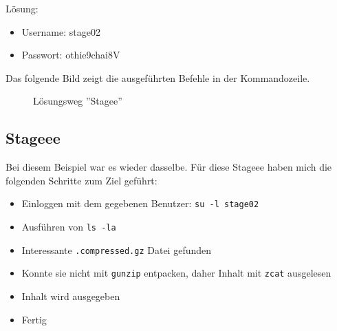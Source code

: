 \documentclass[12pt, a4paper, titlepage, oneside]{scrartcl}
\begin{document}
	Lösung:
	\begin{itemize}
		\item Username: stage02

		\item Passwort: othie9chai8V
	\end{itemize}

	Das folgende Bild zeigt die ausgeführten Befehle in der Kommandozeile.
	\begin{figure}[h!]
		\centering
		\caption{Lösungsweg ''Stagee''}
		\label{fig:stagee_solution}
	\end{figure}

	\subsection{Stageee}
	Bei diesem Beispiel war es wieder dasselbe. Für diese Stageee haben mich die
	folgenden Schritte zum Ziel geführt:

	\begin{itemize}
		\item Einloggen mit dem gegebenen Benutzer: \lstinline{su -l stage02}

		\item Ausführen von \lstinline{ls -la}

		\item Interessante \lstinline{.compressed.gz} Datei gefunden

		\item Konnte sie nicht mit \lstinline{gunzip} entpacken, daher Inhalt mit \lstinline{zcat}
			ausgelesen

		\item Inhalt wird ausgegeben

		\item Fertig
	\end{itemize}
\end{document}
